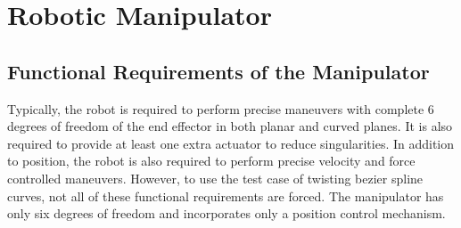 \section{Robotic Manipulator}\label{Chapter:RoboticManipulator}
{
    \subsection{Functional Requirements of the Manipulator}
    {
        Typically, the robot is required to perform precise maneuvers with complete $6$ degrees of freedom of the end effector in both planar and curved planes. It is also required to provide at least one extra actuator to reduce singularities. In addition to position, the robot is also required to perform precise velocity and force controlled maneuvers. However, to use the test case of twisting bezier spline curves, not all of these functional requirements are forced. The manipulator has only six degrees of freedom and incorporates only a position control mechanism.
    }
}

